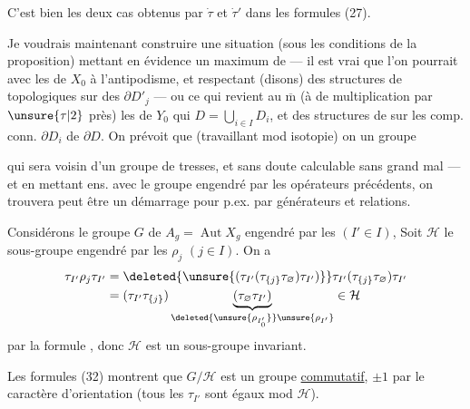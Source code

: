 C'est bien les deux cas obtenus  par $\dot\tau$ et $\dot\tau'$ dans les formules (27).

Je voudrais maintenant construire une situation (sous les conditions de la proposition) mettant en évidence un maximum de  --- il est vrai que l'on pourrait  avec  les  de $X_0$  à l'antipodisme\inserted{$\tau$},  et respectant (disons) des structures de  topologiques sur  des $\partial D'_j$ --- ou ce qui revient  au $\overline{\mathrm m}$ (à  de multiplication par $\unsure{\tau|2}$ près) les  de $Y_0$ qui   $D=\bigcup_{i\in I}D_i$, et  des structures de  sur  les comp. conn. $\partial D_i$ de $\partial D$. On prévoit que (travaillant mod isotopie) on  un groupe



qui sera voisin d'un groupe de tresses, et sans doute calculable sans grand mal --- et en  mettant ens. avec le groupe engendré par les opérateurs précédents, on trouvera peut être un démarrage pour  p.ex.  par générateurs  et relations.

Considérons le  groupe $G$ de $A_g=\operatorname{Aut}X_g$ engendré par les  $(I'\in I)$,  Soit $\mathcal H$  le sous-groupe engendré par les $\rho_j$ $(j\in I)$. On a
\[
\begin{aligned}
\tau_{I'}\rho_j\tau_{I'}
&=\deleted{\unsure{(\tau_{I'}(\tau_{\{j\}}\tau_{\varnothing})\tau_{I'})}}
\tau_{I'}(\tau_{\{j\}}\tau_{\varnothing})\tau_{I'}\\
&=(\tau_{I'}\tau_{\{j\}})
\underbrace{(\tau_{\varnothing}\tau_{I'})}_{\deleted{\unsure{\rho_{I'_0}}}\unsure{\rho_{I'}}}
\in\mathcal H
\end{aligned}
\]
par la formule , donc $\mathcal H$ est un sous-groupe invariant.

Les formules (32) montrent que $G/\mathcal H$ est un groupe \uline{commutatif},  $\pm1$ par le caractère d'orientation (tous les $\tau_{I'}$ sont égaux mod $\mathcal H$).

